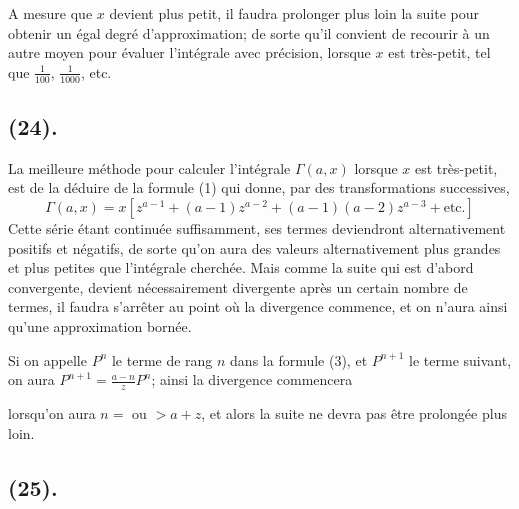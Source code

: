 \documentclass{article}
\begin{document}
A mesure que $x$ devient plus petit, il faudra prolonger plus loin la suite pour obtenir un égal degré d'approximation; de sorte qu'il convient de recourir à un autre moyen pour évaluer l'intégrale avec précision, lorsque $x$ est très-petit, tel que $\frac{1}{100}$, $\frac{1}{1000}$, etc.

\subsection*{(24).}

La meilleure méthode pour calculer l'intégrale $\Gamma(a,x)$ lorsque $x$ est très-petit, est de la déduire de la formule (1) qui donne, par des transformations successives,
\[ \Gamma(a,x)=x[z^{a-1}+(a-1)z^{a-2}+(a-1)(a-2)z^{a-3}+\text{etc.}] \tag{3} \]
Cette série étant continuée suffisamment, ses termes deviendront alternativement positifs et négatifs, de sorte qu'on aura des valeurs alternativement plus grandes et plus petites que l'intégrale cherchée. Mais comme la suite qui est d'abord convergente, devient nécessairement divergente après un certain nombre de termes, il faudra s'arrêter au point où la divergence commence, et on n'aura ainsi qu'une approximation bornée.

Si on appelle $P^{n}$ le terme de rang $n$ dans la formule (3), et $P^{n+1}$ le terme suivant, on aura $P^{n+1}=\frac{a-n}{z}P^{n}$; ainsi la divergence commencera

lorsqu'on aura $n=$ ou $>a+z$, et alors la suite ne devra pas être prolongée plus loin.

\subsection*{(25).}
\end{document}
